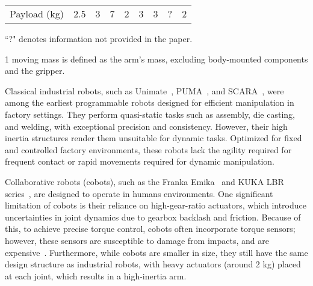 \begin{table*}[ht]
{\begin{threeparttable}
\begin{tabular}{l||c|c|c|c|c|c|c|c}
Payload (kg)                & 2.5     & 3            & 7                & 2              & 3       & 3                      & ?        & 2\\ 
\end{tabular}
\begin{tablenotes}
\item ``?" denotes information not provided in the paper.
\item[1] moving mass is defined as the arm’s mass, excluding body-mounted components and the gripper.
\end{tablenotes}
\end{threeparttable}
}
\end{table*}
Classical industrial robots, such as Unimate~\cite{devol1961programmed}, PUMA~\cite{beecher1979puma}, and SCARA~\cite{makino1980selective}, were among the earliest programmable robots designed for efficient manipulation in factory settings. They perform quasi-static tasks such as assembly, die casting, and welding, with exceptional precision and consistency. However, their high inertia structures render them unsuitable for dynamic tasks. Optimized for fixed and controlled factory environments, these robots lack the agility required for frequent contact or rapid movements required for dynamic manipulation.

Collaborative robots (cobots), such as the Franka Emika~\cite{haddadin2022franka} and KUKA LBR series~\cite{hirzinger2001new, hirzinger2002dlr, albu2007dlr}, are designed to operate in humans environments. One significant limitation of cobots is their reliance on high-gear-ratio actuators, which introduce uncertainties in joint dynamics due to gearbox backlash and friction. Because of this, to achieve precise torque control, cobots often incorporate torque sensors; however, these sensors are susceptible to damage from impacts, and are expensive~\cite{zhu2023design}. Furthermore, while cobots are smaller in size, they still have the same design structure as industrial robots, with heavy actuators (around 2 kg) placed at each joint, which results in a high-inertia arm.

